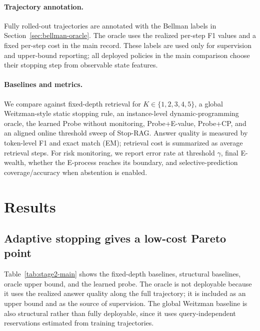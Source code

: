 \documentclass{article}
\begin{document}
\paragraph{Trajectory annotation.}
Fully rolled-out trajectories are annotated with the Bellman labels in Section~\ref{sec:bellman-oracle}. The oracle uses the realized per-step F1 values and a fixed per-step cost in the main record. These labels are used only for supervision and upper-bound reporting; all deployed policies in the main comparison choose their stopping step from observable state features.

\paragraph{Baselines and metrics.}
We compare against fixed-depth retrieval for $K\in\{1,2,3,4,5\}$, a global Weitzman-style static stopping rule, an instance-level dynamic-programming oracle, the learned Probe without monitoring, Probe+E-value, Probe+CP, and an aligned online threshold sweep of Stop-RAG. Answer quality is measured by token-level F1 and exact match (EM); retrieval cost is summarized as average retrieval steps. For risk monitoring, we report error rate at threshold $\gamma$, final E-wealth, whether the E-process reaches its boundary, and selective-prediction coverage/accuracy when abstention is enabled.

\section{Results}
\label{sec:results}

\subsection{Adaptive stopping gives a low-cost Pareto point}
\label{sec:adaptive-results}

Table~\ref{tab:stage2-main} shows the fixed-depth baselines, structural baselines, oracle upper bound, and the learned probe. The oracle is not deployable because it uses the realized answer quality along the full trajectory; it is included as an upper bound and as the source of supervision. The global Weitzman baseline is also structural rather than fully deployable, since it uses query-independent reservations estimated from training trajectories.
\end{document}
